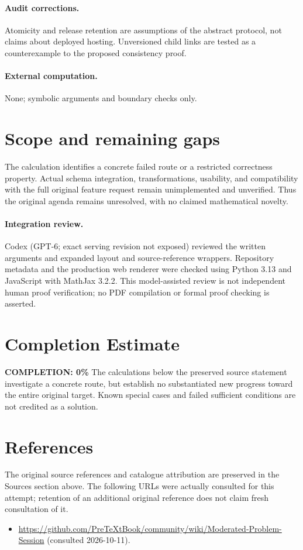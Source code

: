 \documentclass[11pt]{article}
\begin{document}
\paragraph{Audit corrections.} Atomicity and release retention are assumptions of the abstract protocol, not claims about deployed hosting. Unversioned child links are tested as a counterexample to the proposed consistency proof.
\paragraph{External computation.} None; symbolic arguments and boundary checks only.
\section{Scope and remaining gaps}
The calculation identifies a concrete failed route or a restricted correctness property. Actual schema integration, transformations, usability, and compatibility with the full original feature request remain unimplemented and unverified. Thus the original agenda remains unresolved, with no claimed mathematical novelty.
\paragraph{Integration review.} Codex (GPT-6; exact serving revision not exposed) reviewed the written arguments and expanded layout and source-reference wrappers. Repository metadata and the production web renderer were checked using Python 3.13 and JavaScript with MathJax 3.2.2. This model-assisted review is not independent human proof verification; no PDF compilation or formal proof checking is asserted.

\section{Completion Estimate}
\noindent\textbf{COMPLETION: 0\%}
The calculations below the preserved source statement investigate a concrete route,
but establish no substantiated new progress toward the entire original target.
Known special cases and failed sufficient conditions are not credited as a solution.
\section{References}
The original source references and catalogue attribution are preserved in the
Sources section above. The following URLs were actually consulted for this attempt;
retention of an additional original reference does not claim fresh consultation of it.
\begin{itemize}
\item \url{https://github.com/PreTeXtBook/community/wiki/Moderated-Problem-Session} (consulted 2026-10-11). 
\end{itemize}
\end{document}
